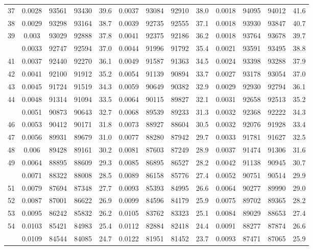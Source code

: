\documentclass[
  14pt,
]{article}
\begin{document}
\begin{longtable}[t]{lcccccccccccc}
37 & 0.0028 & 93561 & 93430 & 39.6 & 0.0037 & 93084 & 92910 & 38.0 & 0.0018 & 94095 & 94012 & 41.6\\
38 & 0.0029 & 93298 & 93164 & 38.7 & 0.0039 & 92735 & 92555 & 37.1 & 0.0018 & 93930 & 93847 & 40.7\\
39 & 0.003 & 93029 & 92888 & 37.8 & 0.0041 & 92375 & 92186 & 36.2 & 0.0018 & 93764 & 93678 & 39.7\\
\addlinespace
40 & 0.0033 & 92747 & 92594 & 37.0 & 0.0044 & 91996 & 91792 & 35.4 & 0.0021 & 93591 & 93495 & 38.8\\
41 & 0.0037 & 92440 & 92270 & 36.1 & 0.0049 & 91587 & 91363 & 34.5 & 0.0024 & 93398 & 93288 & 37.9\\
42 & 0.0041 & 92100 & 91912 & 35.2 & 0.0054 & 91139 & 90894 & 33.7 & 0.0027 & 93178 & 93054 & 37.0\\
43 & 0.0045 & 91724 & 91519 & 34.3 & 0.0059 & 90649 & 90382 & 32.9 & 0.0029 & 92930 & 92794 & 36.1\\
44 & 0.0048 & 91314 & 91094 & 33.5 & 0.0064 & 90115 & 89827 & 32.1 & 0.0031 & 92658 & 92513 & 35.2\\
\addlinespace
45 & 0.0051 & 90873 & 90643 & 32.7 & 0.0068 & 89539 & 89233 & 31.3 & 0.0032 & 92368 & 92222 & 34.3\\
46 & 0.0053 & 90412 & 90171 & 31.8 & 0.0073 & 88927 & 88604 & 30.5 & 0.0032 & 92076 & 91928 & 33.4\\
47 & 0.0056 & 89931 & 89679 & 31.0 & 0.0077 & 88280 & 87942 & 29.7 & 0.0033 & 91781 & 91627 & 32.5\\
48 & 0.006 & 89428 & 89161 & 30.2 & 0.0081 & 87603 & 87249 & 28.9 & 0.0037 & 91474 & 91306 & 31.6\\
49 & 0.0064 & 88895 & 88609 & 29.3 & 0.0085 & 86895 & 86527 & 28.2 & 0.0042 & 91138 & 90945 & 30.7\\
\addlinespace
50 & 0.0071 & 88322 & 88008 & 28.5 & 0.0089 & 86158 & 85776 & 27.4 & 0.0052 & 90751 & 90514 & 29.9\\
51 & 0.0079 & 87694 & 87348 & 27.7 & 0.0093 & 85393 & 84995 & 26.6 & 0.0064 & 90277 & 89990 & 29.0\\
52 & 0.0087 & 87001 & 86622 & 26.9 & 0.0099 & 84596 & 84179 & 25.9 & 0.0075 & 89702 & 89365 & 28.2\\
53 & 0.0095 & 86242 & 85832 & 26.2 & 0.0105 & 83762 & 83323 & 25.1 & 0.0084 & 89029 & 88653 & 27.4\\
54 & 0.0103 & 85421 & 84983 & 25.4 & 0.0112 & 82884 & 82418 & 24.4 & 0.0091 & 88277 & 87874 & 26.6\\
\addlinespace
55 & 0.0109 & 84544 & 84085 & 24.7 & 0.0122 & 81951 & 81452 & 23.7 & 0.0093 & 87471 & 87065 & 25.9\\

\end{longtable}
\end{document}
